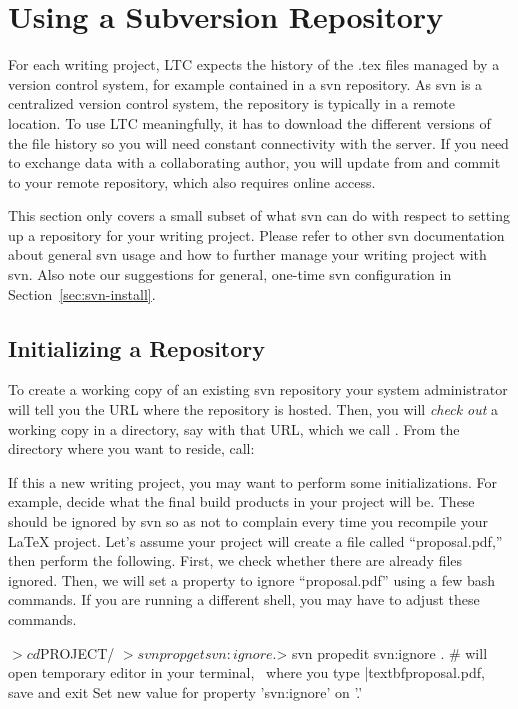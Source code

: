 \section{Using a Subversion Repository} \label{sec:svn-use}

For each writing project, LTC expects the history of the .tex files managed by a version control system, for example contained in a svn repository.  As svn is a centralized version control system, the repository is typically in a remote location.  To use LTC meaningfully, it has to download the different versions of the file history so you will need constant connectivity with the server.  If you need to exchange data with a collaborating author, you will update from and commit to your remote repository, which also requires online access.

This section only covers a small subset of what svn can do with respect to setting up a repository for your writing project.  Please refer to other svn documentation about general svn usage and how to further manage your writing project with svn.  Also note our suggestions for general, one-time svn configuration in Section~\ref{sec:svn-install}.

\subsection{Initializing a Repository}

To create a working copy of an existing svn repository your system administrator will tell you the URL where the repository is hosted.  Then, you will \textit{check out} a working copy in a directory, say  with that URL, which we call .  From the directory where you want  to reside, call:

If this a new writing project, you may want to perform some initializations.  For example, decide what the final build products in your project will be.  These should be ignored by svn so as not to complain every time you recompile your LaTeX project.  Let's assume your project will create a file called ``proposal.pdf,'' then perform the following.  First, we check whether there are already files ignored.  Then, we will set a property to ignore ``proposal.pdf'' using a few bash commands.  If you are running a different shell, you may have to adjust these commands.
\begin{CodeVerbatim}[commandchars=\|\{\}]
$> cd $PROJECT/
$> svn propget svn:ignore .
$> svn propedit svn:ignore .  # will open temporary editor in your terminal, \ 
                                where you type |textbf{proposal.pdf}, save and exit
Set new value for property 'svn:ignore' on '.'
\end{CodeVerbatim}

